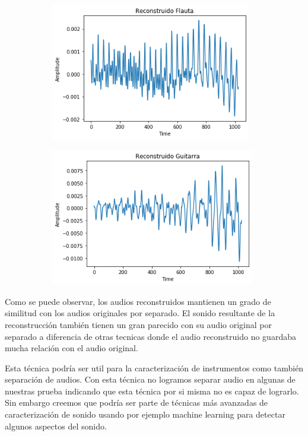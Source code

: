 \begin{figure}[h!]
    \begin{subfigure}{.5\textwidth}
        \centering
        \includegraphics[height=60mm]{Content/Figures/separacion_reconstruccion_audio1.png}
    \end{subfigure}
    \begin{subfigure}{.5\textwidth}
        \centering
        \includegraphics[height=60mm]{Content/Figures/separacion_reconstruccion_audio2.png}
    \end{subfigure}
\end{figure}

Como se puede observar, los audios reconstruidos mantienen un grado de similitud con los audios originales por separado. El sonido resultante de la reconstrucci\'on tambi\'en tienen un gran parecido con su audio original por separado a diferencia de otras tecnicas donde el audio reconstruido no guardaba mucha relaci\'on con el audio original.


Esta t\'ecnica podr\'ia ser util para la caracterizaci\'on de instrumentos como tambi\'en separaci\'on de audios. Con esta t\'ecnica no logramos separar audio en algunas de nuestras prueba indicando que esta t\'ecnica por si misma no es capaz de lograrlo. Sin embargo creemos que podr\'ia ser parte de t\'ecnicas m\'as avanzadas de caracterizaci\'on de sonido usando por ejemplo machine learning para detectar algunos aspectos del sonido.

